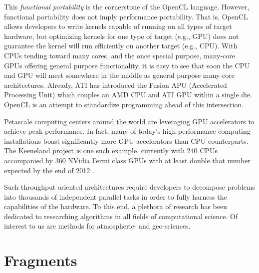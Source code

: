 This \textit{functional portability} is the cornerstone of the OpenCL language. However, functional portability does not imply performance portability. That is, OpenCL allows developers to write kernels capable of running on all types of target hardware, but optimizing kernels for one type of target (e.g., GPU) does not guarantee the kernel will run efficiently on another target (e.g., CPU).
With CPUs tending toward many cores, and the once special purpose, many-core GPUs offering general purpose functionality, it is easy to see that soon the CPU and GPU will meet somewhere in the middle as general purpose many-core architectures. Already, ATI has introduced the Fusion APU (Accelerated Processing Unit) which couples an AMD CPU and ATI GPU within a single die. OpenCL is an attempt to standardize programming ahead of this intersection. 


Petascale computing centers around the world are leveraging GPU accelerators to achieve peak performance. In fact, many of today's high performance computing installations boast significantly more GPU accelerators than CPU counterparts. The Keeneland project is one such example, currently with 240 CPUs accompanied by 360 NVidia Fermi class GPUs with at least double that number expected by the end of 2012 \cite{Vetter2011}. 

Such throughput oriented architectures require developers to decompose problems into thousands of independent parallel tasks in order to fully harness the capabilities of the hardware. To this end, a plethora of research has been dedicated to researching algorithms in all fields of computational science. Of interest to us are methods for atmospheric- and geo-sciences. 


\section{Fragments} 

